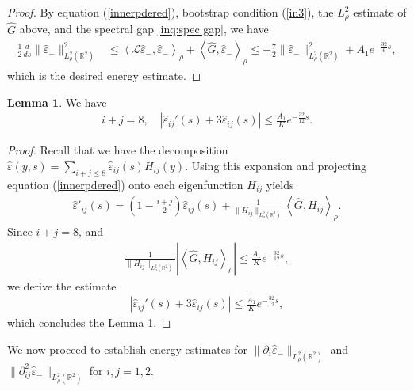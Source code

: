 \documentclass[11pt,reqno]{amsart}
\theoremstyle{definition}
\theoremstyle{bfremark}
\newtheorem{lemma}{Lemma}[section]
\numberwithin{equation}{section}
\newcommand{\veph}{\hat\varepsilon }
\begin{document}
\begin{proof}
    By equation (\ref{innerpdered}), bootstrap condition (\ref{in3}), the \(L^{2}_{\rho}\) estimate of \(\hat{G}\) above, and the spectral gap \ref{inq:spec gap}, we have
    \begin{align*}
        \frac{1}{2}\frac{d}{ds}\|\veph_-\|^2_{L^2_{\rho}(\mathbb{R}^2)} &\leq \left<\mathcal{L}\veph_-,\veph_-\right>_{\rho}+\left<\hat{G},\veph_-\right>_{\rho} \leq -\frac{7}{2}\|\veph_-\|^2_{L^2_{\rho}(\mathbb{R}^2)}+A_1e^{-\frac{32}{6}s},
    \end{align*}
which is the desired energy estimate.
\end{proof}

\begin{lemma}
\label{Lemma 5.3}
We have 
    \begin{align}
       i + j = 8, \quad  |\veph_{ij}'(s)+3\veph_{ij}(s)| \leq \frac{A_1}{K}e^{-\frac{32}{12}s}.\label{en2}
    \end{align}
\end{lemma}
\begin{proof}
    Recall that we have the decomposition \(\veph(y,s)=\sum_{i+j \leq 8} \veph_{ij}(s)H_{ij}(y)\). Using this expansion and projecting equation (\ref{innerpdered}) onto each eigenfunction \(H_{ij}\) yields
    \begin{align}
        \veph'_{ij}(s)=\left(1-\frac{i+j}{2}\right)\veph_{ij}(s)+\frac{1}{\|H_{ij}\|_{L^2_{\rho}(\mathbb{R}^2)}}\left<\hat{G},H_{ij}\right>_{\rho}.\label{pdecom}
    \end{align}
    Since \(i+j=8\), and 
    \begin{align*}
        \frac{1}{\|H_{ij}\|_{L^2_{\rho}(\mathbb{R}^2)}}\left|\left<\hat{G},H_{ij}\right>_{\rho} \right| \leq \frac{A_1}{K}e^{-\frac{32}{12}s},
    \end{align*}
    we derive the estimate
    \begin{align*}
        |\veph_{ij}'(s)+3\veph_{ij}(s)| \leq \frac{A_1}{K}e^{-\frac{32}{12}s},
    \end{align*}
    which concludes the Lemma \ref{Lemma 5.3}.
\end{proof}

We now proceed to establish energy estimates for
\(\|\partial_i\veph_-\|_{L^2_{\rho}(\mathbb{R}^2)}\) and \(\|\partial^2_{ij}\veph_-\|_{L^2_{\rho}(\mathbb{R}^2)}\) for \(i,j=1,2\).\\
\end{document}
